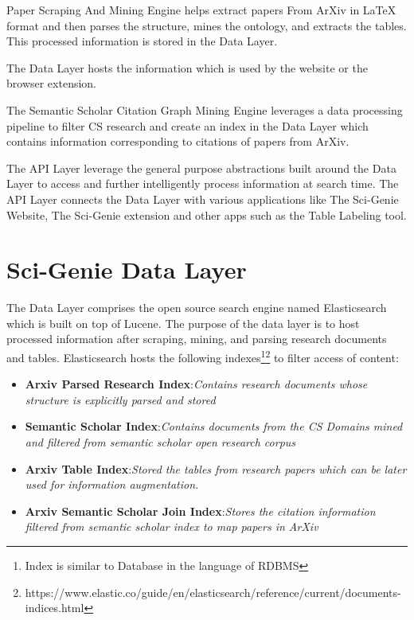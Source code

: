 Paper Scraping And Mining Engine helps extract papers From ArXiv in LaTeX format and then parses the structure, mines the ontology, and extracts the tables. This processed information is stored in the Data Layer. 

The Data Layer hosts the information which is used by the website or the browser extension. 

The Semantic Scholar Citation Graph Mining Engine leverages a data processing pipeline to filter CS research and create an index in the Data Layer which contains information corresponding to citations of papers from ArXiv. 

The API Layer leverage the general purpose abstractions built around the Data Layer to access and further intelligently process information at search time. The API Layer connects the Data Layer with various applications like The Sci-Genie Website, The Sci-Genie extension and other apps such as the Table Labeling tool. 

\section{Sci-Genie Data Layer}
\label{sci-genie-core:data-layer}
The Data Layer comprises the open source search engine named Elasticsearch\parencite{gormley2015elasticsearch} which is built on top of Lucene. 
The purpose of the data layer is to host processed information after scraping, mining, and parsing research documents and tables. 
Elasticsearch hosts the following indexes\footnote{Index is similar to Database in the language of RDBMS}\footnote{https://www.elastic.co/guide/en/elasticsearch/reference/current/documents-indices.html} to filter access of content:
\begin{itemize}
    \item \textbf{Arxiv Parsed Research Index}:\textit{Contains research documents whose structure is explicitly parsed and stored}
    \item \textbf{Semantic Scholar Index}:\textit{Contains documents from the CS Domains mined and filtered from semantic scholar open research corpus}
    \item \textbf{Arxiv Table Index}:\textit{Stored the tables from research papers which can be later used for information augmentation.}
    \item \textbf{Arxiv Semantic Scholar Join Index}:\textit{Stores the citation information filtered from semantic scholar index to map papers in ArXiv} 
\end{itemize} 

